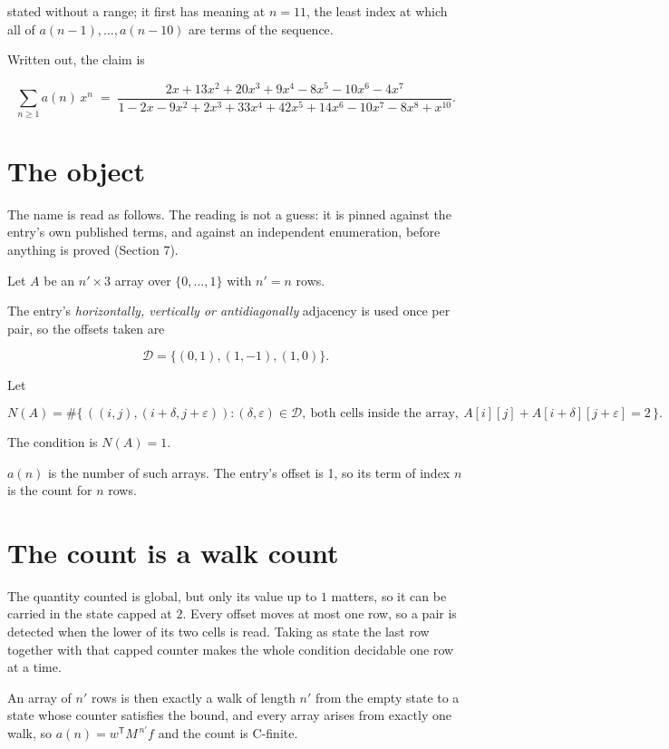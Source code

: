 \documentclass[11pt]{article}
\theoremstyle{definition}
\begin{document}
stated without a range; it first has meaning at $n = 11$, the least index at which all of $a(n-1),\dots,a(n-10)$ are terms of the sequence.

Written out, the claim is

\[\sum_{n \ge 1} a(n)\,x^n \;=\; \frac{2x + 13x^{2} + 20x^{3} + 9x^{4} - 8x^{5} - 10x^{6} - 4x^{7}}{1 - 2x - 9x^{2} + 2x^{3} + 33x^{4} + 42x^{5} + 14x^{6} - 10x^{7} - 8x^{8} + x^{10}}.\]

\section{The object}

The name is read as follows. The reading is not a guess: it is pinned against the entry's own published terms, and against an independent enumeration, before anything is proved (Section 7).

Let $A$ be an $n' \times 3$ array over $\{0,\dots,1\}$ with $n' = n$ rows.

The entry's {\itshape horizontally, vertically or antidiagonally} adjacency is used once per pair, so the offsets taken are

\[\mathcal{D} = \{(0,1), (1,-1), (1,0)\}.\]

Let

\[N(A) = \#\bigl\{\,((i,j),(i{+}\delta,j{+}\varepsilon)) : (\delta,\varepsilon) \in \mathcal{D},\ \text{both cells inside the array},\ A[i][j] + A[i{+}\delta][j{+}\varepsilon] = 2\,\bigr\}.\]

The condition is $N(A) = 1$.

$a(n)$ is the number of such arrays. The entry's offset is 1, so its term of index $n$ is the count for $n$ rows.

\section{The count is a walk count}

The quantity counted is global, but only its value up to $1$ matters, so it can be carried in the state capped at $2$. Every offset moves at most one row, so a pair is detected when the lower of its two cells is read. Taking as state the last row together with that capped counter makes the whole condition decidable one row at a time.

An array of $n'$ rows is then exactly a walk of length $n'$ from the empty state to a state whose counter satisfies the bound, and every array arises from exactly one walk, so $a(n) = w^{\mathsf T}M^{\,n'}f$ and the count is C-finite.
\end{document}
